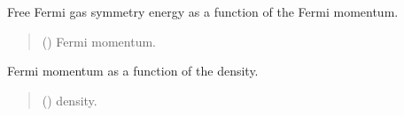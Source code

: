 \documentclass[letterpaper,10pt,english]{sphinxmanual}
\begin{document}

\begin{fulllineitems}
\label{\detokenize{source/api/setup_matter_ffg:nucleardatapy.matter.setup_ffg.esymffg_nr}}
\pysigstartsignatures
{}
\pysigstopsignatures
\sphinxAtStartPar
Free Fermi gas symmetry energy as a function of the Fermi momentum.
\begin{quote}\begin{description}
\sphinxAtStartPar
{} () \textendash{} Fermi momentum.

\end{description}\end{quote}

\end{fulllineitems}


\begin{fulllineitems}
\label{\detokenize{source/api/setup_matter_ffg:nucleardatapy.matter.setup_ffg.kf}}
\pysigstartsignatures
{}
\pysigstopsignatures
\sphinxAtStartPar
Fermi momentum as a function of the density.
\begin{quote}\begin{description}
\sphinxAtStartPar
{} () \textendash{} density.

\end{description}\end{quote}

\end{fulllineitems}
\end{document}
